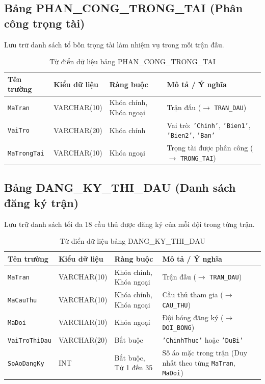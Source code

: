 \subsection{Bảng PHAN\_CONG\_TRONG\_TAI (Phân công trọng tài)}
Lưu trữ danh sách tổ bốn trọng tài làm nhiệm vụ trong mỗi trận đấu.
\begin{table}[H]
\centering
\small
\begin{tabular}{|l|l|l|p{6cm}|}
\hline
\textbf{Tên trường} & \textbf{Kiểu dữ liệu} & \textbf{Ràng buộc} & \textbf{Mô tả / Ý nghĩa} \\ \hline
\texttt{MaTran} & VARCHAR(10) & Khóa chính, Khóa ngoại & Trận đấu ($\rightarrow$ \texttt{TRAN\_DAU}) \\ \hline
\texttt{VaiTro} & VARCHAR(20) & Khóa chính & Vai trò: \texttt{'Chinh'}, \texttt{'Bien1'}, \texttt{'Bien2'}, \texttt{'Ban'} \\ \hline
\texttt{MaTrongTai} & VARCHAR(10) & Khóa ngoại & Trọng tài được phân công ($\rightarrow$ \texttt{TRONG\_TAI}) \\ \hline
\end{tabular}
\caption{Từ điển dữ liệu bảng PHAN\_CONG\_TRONG\_TAI}
\end{table}

\subsection{Bảng DANG\_KY\_THI\_DAU (Danh sách đăng ký trận)}
Lưu trữ danh sách tối đa 18 cầu thủ được đăng ký của mỗi đội trong từng trận.
\begin{table}[H]
\centering
\small
\begin{tabular}{|l|l|l|p{6cm}|}
\hline
\textbf{Tên trường} & \textbf{Kiểu dữ liệu} & \textbf{Ràng buộc} & \textbf{Mô tả / Ý nghĩa} \\ \hline
\texttt{MaTran} & VARCHAR(10) & Khóa chính, Khóa ngoại & Trận đấu ($\rightarrow$ \texttt{TRAN\_DAU}) \\ \hline
\texttt{MaCauThu} & VARCHAR(10) & Khóa chính, Khóa ngoại & Cầu thủ tham gia ($\rightarrow$ \texttt{CAU\_THU}) \\ \hline
\texttt{MaDoi} & VARCHAR(10) & Khóa ngoại & Đội bóng đăng ký ($\rightarrow$ \texttt{DOI\_BONG}) \\ \hline
\texttt{VaiTroThiDau} & VARCHAR(20) & Bắt buộc & \texttt{'ChinhThuc'} hoặc \texttt{'DuBi'} \\ \hline
\texttt{SoAoDangKy} & INT & Bắt buộc, Từ 1 đến 35 & Số áo mặc trong trận (Duy nhất theo từng \texttt{MaTran}, \texttt{MaDoi}) \\ \hline
\end{tabular}
\caption{Từ điển dữ liệu bảng DANG\_KY\_THI\_DAU}
\end{table}

